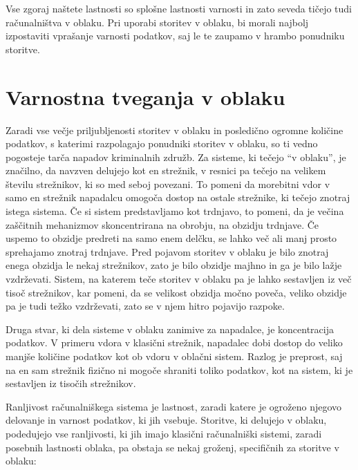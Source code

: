 \documentclass[12pt,a4paper,openany,tikz]{book}
\theoremstyle{plain}
\theoremstyle{definition}
\begin{document}
Vse zgoraj naštete lastnosti so splošne lastnosti varnosti in zato seveda tičejo tudi računalništva v oblaku. Pri uporabi storitev v oblaku, bi morali najbolj izpostaviti vprašanje varnosti podatkov, saj le te zaupamo v hrambo ponudniku storitve.

\chapter{Varnostna tveganja v oblaku}

Zaradi vse večje priljubljenosti storitev v oblaku in posledično ogromne količine podatkov, s katerimi razpolagajo ponudniki storitev v oblaku, so ti vedno pogosteje tarča napadov kriminalnih združb. Za sisteme, ki tečejo “v oblaku”, je značilno, da navzven delujejo kot en strežnik, v resnici pa tečejo na velikem številu strežnikov, ki so med seboj povezani. To pomeni da morebitni vdor v samo en strežnik napadalcu omogoča dostop na ostale strežnike, ki tečejo znotraj istega sistema. Če si sistem predstavljamo kot trdnjavo, to pomeni, da je večina zaščitnih mehanizmov skoncentrirana na obrobju, na obzidju trdnjave. Če uspemo to obzidje predreti na samo enem delčku, se lahko več ali manj prosto sprehajamo znotraj trdnjave. Pred pojavom storitev v oblaku je bilo znotraj enega obzidja le nekaj strežnikov, zato je bilo obzidje majhno in ga je bilo lažje vzdrževati. Sistem, na katerem teče storitev v oblaku pa je lahko sestavljen iz več tisoč strežnikov, kar pomeni, da se velikost obzidja močno poveča, veliko obzidje pa je tudi težko vzdrževati, zato se v njem hitro pojavijo razpoke.

Druga stvar, ki dela sisteme v oblaku zanimive za napadalce, je koncentracija podatkov. V primeru vdora v klasični strežnik, napadalec dobi dostop do veliko manjše količine podatkov kot ob vdoru v oblačni sistem. Razlog je preprost, saj na en sam strežnik fizično ni mogoče shraniti toliko podatkov, kot na sistem, ki je sestavljen iz tisočih strežnikov.

Ranljivost računalniškega sistema je lastnost, zaradi katere je ogroženo njegovo delovanje in varnost podatkov, ki jih vsebuje. Storitve, ki delujejo v oblaku,  podedujejo vse ranljivosti, ki jih imajo klasični računalniški sistemi, zaradi posebnih lastnosti oblaka, pa obstaja se nekaj groženj, specifičnih za storitve v oblaku:
\end{document}
